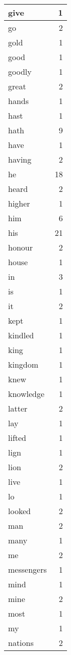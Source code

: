 \begin{center}
\begin{longtable}{l|r}
give & 1\\ \hline 
go & 2\\ \hline 
gold & 1\\ \hline 
good & 1\\ \hline 
goodly & 1\\ \hline 
great & 2\\ \hline 
hands & 1\\ \hline 
hast & 1\\ \hline 
hath & 9\\ \hline 
have & 1\\ \hline 
having & 2\\ \hline 
he & 18\\ \hline 
heard & 2\\ \hline 
higher & 1\\ \hline 
him & 6\\ \hline 
his & 21\\ \hline 
honour & 2\\ \hline 
house & 1\\ \hline 
in & 3\\ \hline 
is & 1\\ \hline 
it & 2\\ \hline 
kept & 1\\ \hline 
kindled & 1\\ \hline 
king & 1\\ \hline 
kingdom & 1\\ \hline 
knew & 1\\ \hline 
knowledge & 1\\ \hline 
latter & 2\\ \hline 
lay & 1\\ \hline 
lifted & 1\\ \hline 
lign & 1\\ \hline 
lion & 2\\ \hline 
live & 1\\ \hline 
lo & 1\\ \hline 
looked & 2\\ \hline 
man & 2\\ \hline 
many & 1\\ \hline 
me & 2\\ \hline 
messengers & 1\\ \hline 
mind & 1\\ \hline 
mine & 2\\ \hline 
most & 1\\ \hline 
my & 1\\ \hline 
nations & 2\\ \hline 

\end{longtable}
\end{center}
